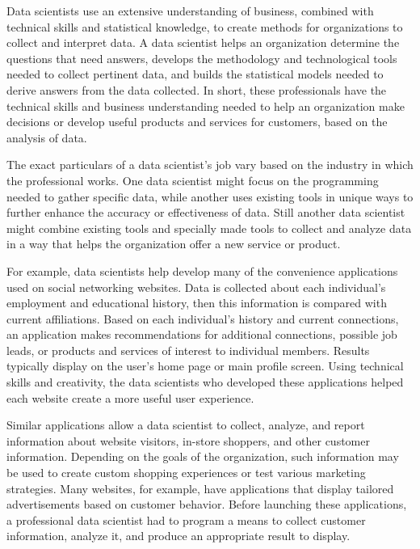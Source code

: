 \begin{description}

Data scientists use an extensive understanding of business, combined with technical skills and statistical knowledge, to create methods for organizations to collect and interpret data. A data scientist helps an organization determine the questions that need answers, develops the methodology and technological tools needed to collect pertinent data, and builds the statistical models needed to derive answers from the data collected. In short, these professionals have the technical skills and business understanding needed to help an organization make decisions or develop useful products and services for customers, based on the analysis of data.

The exact particulars of a data scientist's job vary based on the industry in which the professional works. One data scientist might focus on the programming needed to gather specific data, while another uses existing tools in unique ways to further enhance the accuracy or effectiveness of data. Still another data scientist might combine existing tools and specially made tools to collect and analyze data in a way that helps the organization offer a new service or product.

For example, data scientists help develop many of the convenience applications used on social networking websites. Data is collected about each individual’s employment and educational history, then this information is compared with current affiliations. Based on each individual’s history and current connections, an application makes recommendations for additional connections, possible job leads, or products and services of interest to individual members. Results typically display on the user’s home page or main profile screen. Using technical skills and creativity, the data scientists who developed these applications helped each website create a more useful user experience.

Similar applications allow a data scientist to collect, analyze, and report information about website visitors, in-store shoppers, and other customer information. Depending on the goals of the organization, such information may be used to create custom shopping experiences or test various marketing strategies. Many websites, for example, have applications that display tailored advertisements based on customer behavior. Before launching these applications, a professional data scientist had to program a means to collect customer information, analyze it, and produce an appropriate result to display.


\end{description}
